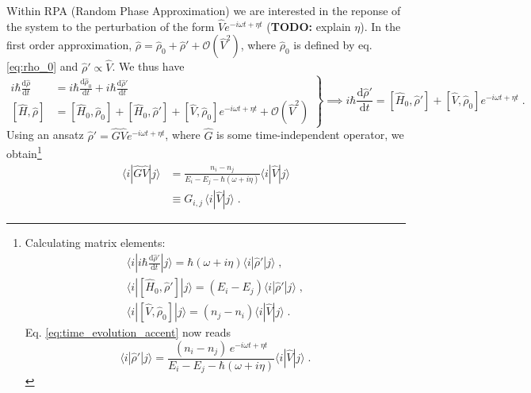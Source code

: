 \documentclass[a4paper,12pt]{article}
\begin{document}
    Within RPA (Random Phase Approximation) we are interested in the reponse of the system to the perturbation of the form $\hat V e^{-i\omega t + \eta t}$ (\textbf{TODO:} explain $\eta$). In the first order approximation, $\hat\rho = \hat\rho_0 + \hat\rho' + \mathcal{O}(\hat V^2)$, where $\hat\rho_0$ is defined by eq. \eqref{eq:rho_0} and $\hat\rho' \propto \hat V$. We thus have
    \begin{equation} \label{eq:time_evolution_accent}
        \left.
        \begin{aligned}
            i\hbar \frac{\text{d}\hat\rho}{\text{d}t} &= i\hbar \frac{\text{d}\hat\rho_0}{\text{d}t} + i\hbar\frac{\text{d}\hat\rho'}{\text{d}t} \\
            [\hat H, \hat\rho] &= [\hat H_0, \hat \rho_0] + [\hat H_0, \hat \rho'] + [\hat V, \hat \rho_0] e^{-i\omega t + \eta t} + \mathcal{O}(\hat V^2)
        \end{aligned} \right\} \implies
        i\hbar \frac{\text{d}\hat\rho'}{\text{d}t} = [\hat H_0, \hat \rho'] + [\hat V, \hat \rho_0] e^{-i\omega t + \eta t}\; .
    \end{equation}
    Using an ansatz $\hat\rho' = \hat G \hat V e^{-i\omega t + \eta t}$, where $\hat G$ is some time-independent operator, we obtain\footnote{ %
    Calculating matrix elements:
    \begin{equation*}
    \begin{gathered}
        \langle i | i\hbar \frac{\text{d}\hat\rho'}{\text{d}t} | j \rangle = 
            \hbar(\omega + i\eta)\langle i| \hat\rho' | j \rangle\; , \\
        \langle i | [\hat H_0, \hat\rho'] | j \rangle = (E_i - E_j) \langle i| \hat\rho' | j \rangle\; , \\
        \langle i | [\hat V, \hat\rho_0] | j \rangle = (n_j - n_i) \langle i| \hat V | j \rangle\; .
    \end{gathered}
    \end{equation*}
    Eq. \eqref{eq:time_evolution_accent} now reads
    \begin{equation*}
         \langle i| \hat\rho' |j\rangle =
            \frac{(n_i - n_j)\, e^{-i\omega t + \eta t}}{E_i - E_j - \hbar(\omega + i\eta)} \langle i| \hat V |j \rangle \; .
    \end{equation*}
} %
    \begin{equation} \label{eq:g_function}
    \begin{aligned}
        \langle i | \hat G \hat V | j \rangle 
            &= \frac{n_i - n_j}{E_i - E_j - \hbar(\omega + i\eta)}\langle i | \hat V | j \rangle \\
            &\equiv G_{i,j}\, \langle i | \hat V | j \rangle\; .
    \end{aligned}
    \end{equation}
\end{document}
